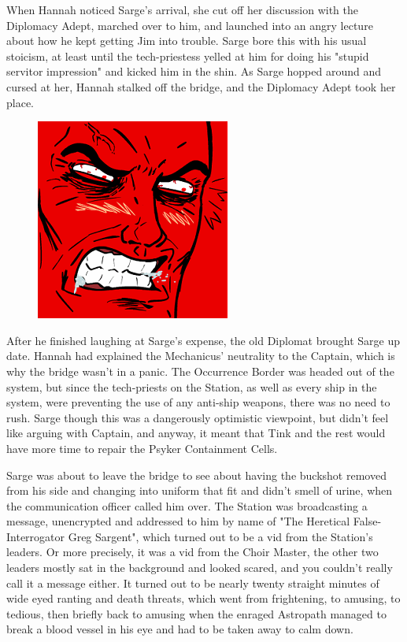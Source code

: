 When Hannah noticed Sarge's arrival, she cut off her discussion with the Diplomacy Adept, marched over to him, and launched into an angry lecture about how he kept getting Jim into trouble. 
Sarge bore this with his usual stoicism, at least until the tech-priestess yelled at him for doing his "stupid servitor impression" and kicked him in the shin. 
As Sarge hopped around and cursed at her, Hannah stalked off the bridge, and the Diplomacy Adept took her place. 


\begin{figure}
	\begin{center}
		\includegraphics[width=\figwidth]{pics/14/50.png}
	\end{center}
\end{figure}
After he finished laughing at Sarge's expense, the old Diplomat brought Sarge up date. 
Hannah had explained the Mechanicus' neutrality to the Captain, which is why the bridge wasn't in a panic. 
The Occurrence Border was headed out of the system, but since the tech-priests on the Station, as well as every ship in the system, were preventing the use of any anti-ship weapons, there was no need to rush. 
Sarge though this was a dangerously optimistic viewpoint, but didn't feel like arguing with Captain, and anyway, it meant that Tink and the rest would have more time to repair the Psyker Containment Cells.

Sarge was about to leave the bridge to see about having the buckshot removed from his side and changing into uniform that fit and didn't smell of urine, when the communication officer called him over. 
The Station was broadcasting a message, unencrypted and addressed to him by name of "The Heretical False-Interrogator Greg Sargent", which turned out to be a vid from the Station's leaders. 
Or more precisely, it was a vid from the Choir Master, the other two leaders mostly sat in the background and looked scared, and you couldn't really call it a message either. 
It turned out to be nearly twenty straight minutes of wide eyed ranting and death threats, which went from frightening, to amusing, to tedious, then briefly back to amusing when the enraged Astropath managed to break a blood vessel in his eye and had to be taken away to calm down. 


